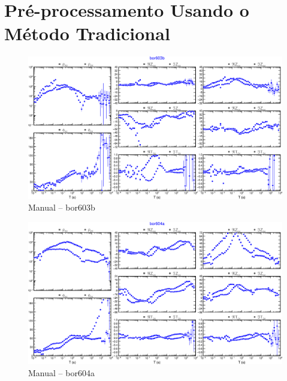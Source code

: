 \chapter{Pré-processamento Usando o Método Tradicional}
\label{ap-trad}
    \begin{figure}[H]
        \caption{Manual -- bor603b}
            \begin{center}
                \includegraphics[width=15cm]{texto/figura/sites/M-bor603b.png}
            \end{center}
    \end{figure}
    \begin{figure}[H]
        \caption{Manual -- bor604a}
            \begin{center}
                \includegraphics[width=15cm]{texto/figura/sites/M-bor604a.png}
            \end{center}
    \end{figure}
    
